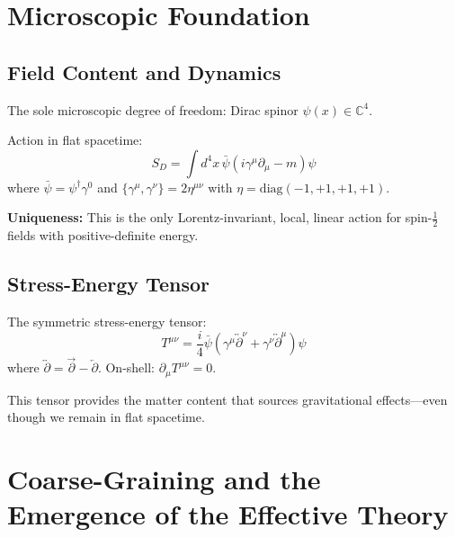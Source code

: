 \documentclass[11pt,a4paper]{article}
\theoremstyle{definition}
\theoremstyle{remark}
\begin{document}
	\section{Microscopic Foundation}
	
	\subsection{Field Content and Dynamics}
	
	The sole microscopic degree of freedom: Dirac spinor $\psi(x)\in\mathbb{C}^4$.
	
	Action in flat spacetime:
	\begin{equation}
		S_D = \int d^4x\,\bar{\psi}(i\gamma^\mu\partial_\mu - m)\psi
		\label{eq:dirac_action}
	\end{equation}
	where $\bar{\psi}=\psi^\dagger\gamma^0$ and $\{\gamma^\mu,\gamma^\nu\}=2\eta^{\mu\nu}$ with $\eta=\mathrm{diag}(-1,+1,+1,+1)$.
	
	\textbf{Uniqueness:} This is the only Lorentz-invariant, local, linear action for spin-$\tfrac{1}{2}$ fields with positive-definite energy.
	
	\subsection{Stress-Energy Tensor}
	
	The symmetric stress-energy tensor:
	\begin{equation}
		T^{\mu\nu} = \frac{i}{4}\bar{\psi}\!\left(\gamma^\mu\overleftrightarrow{\partial}^\nu + \gamma^\nu\overleftrightarrow{\partial}^\mu\right)\!\psi
		\label{eq:stress_energy}
	\end{equation}
	where $\overleftrightarrow{\partial}=\overrightarrow{\partial}-\overleftarrow{\partial}$.  On-shell: $\partial_\mu T^{\mu\nu}=0$.
	
	This tensor provides the matter content that sources gravitational effects---even though we remain in flat spacetime.
	
	\section{Coarse-Graining and the Emergence of the Effective Theory}
	\label{sec:coarse}
	
\end{document}
